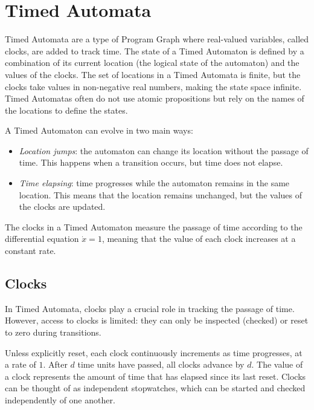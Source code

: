 \section{Timed Automata}

Timed Automata are a type of Program Graph where real-valued variables, called clocks, are added to track time. 
The state of a Timed Automaton is defined by a combination of its current location (the logical state of the automaton) and the values of the clocks.
The set of locations in a Timed Automata is finite, but the clocks take values in non-negative real numbers, making the state space infinite.
Timed Automatas often do not use atomic propositions but rely on the names of the locations to define the states.

A Timed Automaton can evolve in two main ways:
\begin{itemize}
    \item \textit{Location jumps}: the automaton can change its location without the passage of time. 
        This happens when a transition occurs, but time does not elapse.
    \item \textit{Time elapsing}: time progresses while the automaton remains in the same location. 
        This means that the location remains unchanged, but the values of the clocks are updated.
\end{itemize}

The clocks in a Timed Automaton measure the passage of time according to the differential equation $\dot{x}=1$, meaning that the value of each clock increases at a constant rate.

\subsection{Clocks}
In Timed Automata, clocks play a crucial role in tracking the passage of time. 
However, access to clocks is limited: they can only be inspected (checked) or reset to zero during transitions.

Unless explicitly reset, each clock continuously increments as time progresses, at a rate of $1$. 
After $d$ time units have passed, all clocks advance by $d$.
The value of a clock represents the amount of time that has elapsed since its last reset. Clocks can be thought of as independent stopwatches, which can be started and checked independently of one another.


